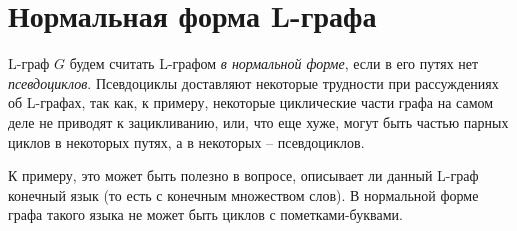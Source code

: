 \section{Нормальная форма L-графа}

L-граф $G$ будем считать L-графом \emph{в нормальной форме}, если в его путях нет \emph{псевдоциклов}.
Псевдоциклы доставляют некоторые трудности при рассуждениях об L-графах, так как, к примеру,
некоторые циклические части графа на самом деле не приводят к зацикливанию, или, что еще хуже, могут
быть частью парных циклов в некоторых путях, а в некоторых -- псевдоциклов. 

К примеру, это может быть полезно в вопросе, описывает ли данный L-граф конечный язык (то есть с конечным множеством слов).
В нормальной форме графа такого языка не может быть циклов с пометками-буквами.

\clearpage